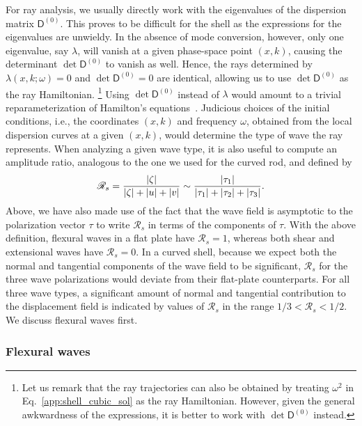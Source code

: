 For ray analysis, we usually directly work with the eigenvalues of the dispersion matrix $\mathsf{D}^{(0)}$.
This proves to be difficult for the shell as the expressions for the eigenvalues are unwieldy.
In the absence of mode conversion, however, only one eigenvalue, say $\lambda$, will vanish at a given phase-space point $(x, k)$, causing the determinant $\det\mathsf{D}^{(0)}$ to vanish as well.
Hence, the rays determined by $\lambda(x, k; \omega) = 0$ and $\det\mathsf{D}^{(0)} = 0$ are identical, allowing us to use $\det\mathsf{D}^{(0)}$ as the ray Hamiltonian.%
\footnote{Let us remark that the ray trajectories can also be obtained by treating $\omega^{2}$ in Eq.~\eqref{app:shell_cubic_sol} as the ray Hamiltonian.  However, given the general awkwardness of the expressions, it is better to work with $\det\mathsf{D}^{(0)}$ instead.}
Using $\det\mathsf{D}^{(0)}$ instead of $\lambda$ would amount to a trivial reparameterization of Hamilton's equations~\cite{tracy2014}.
Judicious choices of the initial conditions, i.e., the coordinates $(x, k)$ and frequency $\omega$, obtained from the local dispersion curves at a given $(x, k)$, would determine the type of wave the ray represents.%
When analyzing a given wave type, it is also useful to compute an amplitude ratio, analogous to the one we used for the curved rod, and defined by
%
\begin{equation}
  \mathscr{R}_{s} = \frac{\lvert\zeta\rvert}{\lvert\zeta\rvert + \lvert u\rvert + \lvert v\rvert} \sim \frac{\lvert\tau_{1}\rvert}{\lvert\tau_{1}\rvert + \lvert\tau_{2}\rvert + \lvert\tau_{3}\rvert}.
  \label{eq:shell_ratio}
\end{equation}
%
Above, we have also made use of the fact that the wave field is asymptotic to the polarization vector $\tau$ to write $\mathscr{R}_{s}$ in terms of the components of $\tau$.
With the above definition, flexural waves in a flat plate have $\mathscr{R}_{s} = 1$, whereas both shear and extensional waves have $\mathscr{R}_{s} = 0$.
In a curved shell, because we expect both the normal and tangential components of the wave field to be significant, $\mathscr{R}_{s}$ for the three wave polarizations would deviate from their flat-plate counterparts.
For all three wave types, a significant amount of normal and tangential contribution to the displacement field is indicated by values of $\mathscr{R}_{s}$ in the range $1/3 < \mathscr{R}_{s} < 1/2$.
We discuss flexural waves first.

\subsubsection{Flexural waves}

